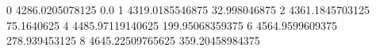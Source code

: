 0 4286.0205078125 0.0
1 4319.0185546875 32.998046875
2 4361.1845703125 75.1640625
4 4485.97119140625 199.95068359375
6 4564.9599609375 278.939453125
8 4645.22509765625 359.20458984375
